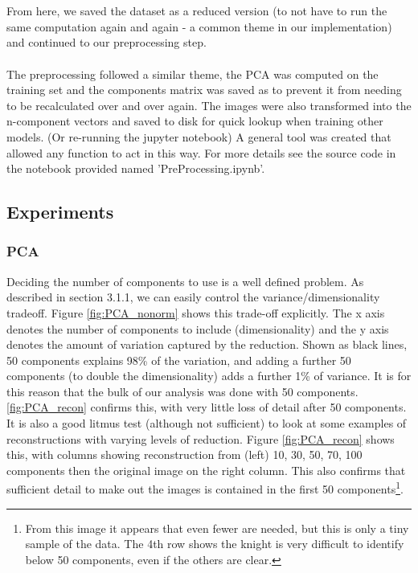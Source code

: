 \documentclass{article}
\begin{document}
\begin{multicols}{2}
\\\\
From here, we saved the dataset as a reduced version (to not have to run the same computation again and again - a common theme in our implementation) and continued to our preprocessing step.
\\
\\
The preprocessing followed a similar theme, the PCA was computed on the training set and the components matrix was saved as to prevent it from needing to be recalculated over and over again.
The images were also transformed into the n-component vectors and saved to disk for quick lookup when training other models. (Or re-running the jupyter notebook)
A general tool was created that allowed any function to act in this way. For more details see the source code in the notebook provided named 'PreProcessing.ipynb'.

\subsection{Experiments}
\subsubsection{PCA}
Deciding the number of components to use is a well defined problem. As described in section 3.1.1, we can easily control the variance/dimensionality tradeoff. Figure \ref{fig:PCA_nonorm} shows this trade-off explicitly. The x axis denotes the number of components to include (dimensionality) and the y axis denotes the amount of variation captured by the reduction. Shown as black lines, 50 components explains 98\% of the variation, and adding a further 50 components (to double the dimensionality) adds a further 1\% of variance. It is for this reason that the bulk of our analysis was done with 50 components. \ref{fig:PCA_recon} confirms this, with very little loss of detail after 50 components. It is also a good litmus test (although not sufficient) to look at some examples of reconstructions with varying levels of reduction. Figure \ref{fig:PCA_recon} shows this, with columns showing reconstruction from (left) 10, 30, 50, 70, 100 components then the original image on the right column. This also confirms that sufficient detail to make out the images is contained in the first 50 components\footnote{From this image it appears that even fewer are needed, but this is only a tiny sample of the data. The 4th row shows the knight is very difficult to identify below 50 components, even if the others are clear.}.


\end{multicols}
\end{document}

